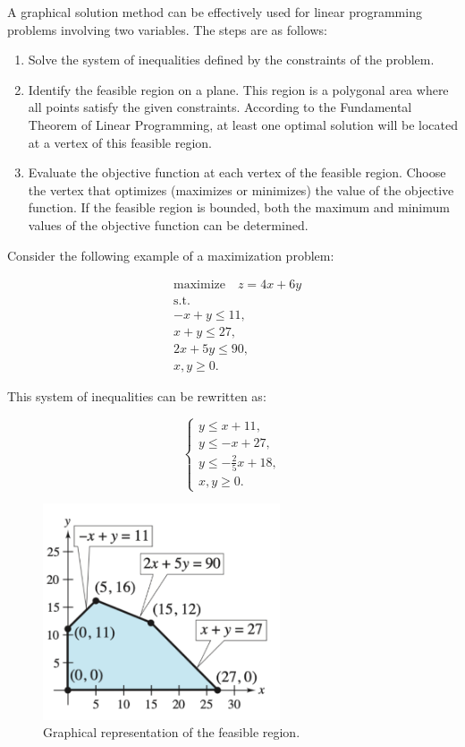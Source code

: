 \documentclass[unicode,11pt,a4paper,oneside,numbers=endperiod,openany]{scrartcl}
\begin{document}
A graphical solution method can be effectively used for linear programming problems involving two variables. The steps are as follows:

\begin{enumerate}
    \item Solve the system of inequalities defined by the constraints of the problem.
    \item Identify the feasible region on a plane. This region is a polygonal area where all points satisfy the given constraints. According to the Fundamental Theorem of Linear Programming, at least one optimal solution will be located at a vertex of this feasible region.
    \item Evaluate the objective function at each vertex of the feasible region. Choose the vertex that optimizes (maximizes or minimizes) the value of the objective function. If the feasible region is bounded, both the maximum and minimum values of the objective function can be determined.
\end{enumerate}

Consider the following example of a maximization problem:

\[
 \begin{aligned}
 &\text{maximize} \quad z = 4x + 6y \\
 &\text{s.t.} \quad \\
 &-x + y \leq 11, \\
 &x + y \leq 27, \\
 &2x + 5y \leq 90, \\
 &x, y \geq 0.
 \end{aligned}
\]

This system of inequalities can be rewritten as:

\[
 \begin{cases}
  y \leq x + 11, \\
  y \leq -x + 27, \\
  y \leq -\frac{2}{5}x + 18, \\
  x, y \geq 0.
 \end{cases}
\]

\begin{figure}[H]
    \centering
    \includegraphics[trim=0cm 0cm 0cm 0cm, clip, width=7cm]{img12.png}
    \caption{Graphical representation of the feasible region.}
    \label{fig:img12}
\end{figure}
\end{document}
